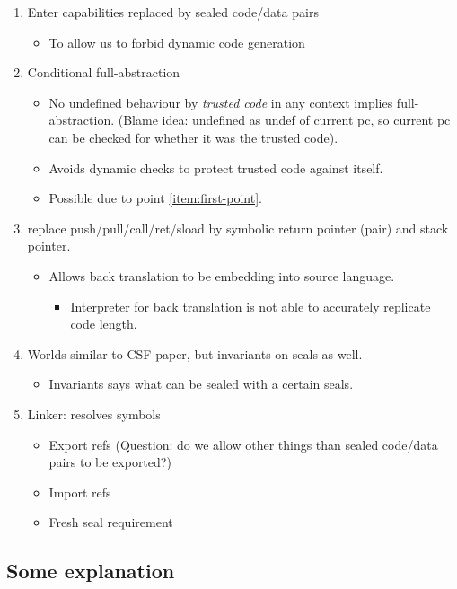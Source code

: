 \documentclass[a4paper]{article}
\begin{document}
\begin{enumerate}
\item Enter capabilities replaced by sealed code/data pairs \label{item:first-point}
  \begin{itemize}
  \item To allow us to forbid dynamic code generation
  \end{itemize}
\item Conditional full-abstraction
  \begin{itemize}
  \item No undefined behaviour by \emph{trusted code} in any context implies full-abstraction. (Blame idea: undefined as undef of current pc, so current pc can be checked for whether it was the trusted code).
  \item Avoids dynamic checks to protect trusted code against itself.
  \item Possible due to point \ref{item:first-point}.
  \end{itemize}
\item replace push/pull/call/ret/sload by symbolic return pointer (pair) and stack pointer.
  \begin{itemize}
  \item Allows back translation to be embedding into source language.
    \begin{itemize}
    \item Interpreter for back translation is not able to accurately replicate code length.
    \end{itemize}
  \end{itemize}
\item Worlds similar to CSF paper, but invariants on seals as well.
  \begin{itemize}
  \item Invariants says what can be sealed with a certain seals.
  \end{itemize}
\item Linker: resolves symbols
  \begin{itemize}
  \item Export refs (Question: do we allow other things than sealed code/data pairs to be exported?)
  \item Import refs
  \item Fresh seal requirement
  \end{itemize}
\end{enumerate}

\subsection{Some explanation}
\end{document}
